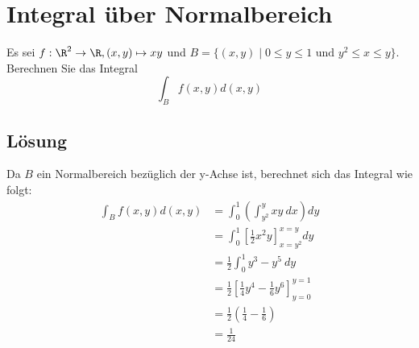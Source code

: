 \newpage
\section{Integral über Normalbereich}
Es sei $f: \R^2 \to \R, (x,y) \mapsto xy$ und $B=\{(x,y) \mid 0\le y\le 1 \text{ und } y^2 \le x \le y\}$. Berechnen Sie das Integral
$$
\int_B f(x,y)d(x,y)
$$
 
\subsection*{Lösung}
Da $B$ ein Normalbereich bezüglich der y-Achse ist, berechnet sich das Integral wie folgt:
\begin{align*}
\int_B f(x,y)d(x,y)&=\int_0^1 \left( \int_{y^2}^y xy \ dx \right) dy\\
&= \int_0^1 \left[ \frac{1}{2}x^2y\right]_{x=y^2}^{x=y} dy\\
&=\frac{1}{2}\int_0^1  y^3-y^5 \ dy \\
&=\frac{1}{2} \left[ \frac{1}{4}y^4 - \frac{1}{6} y^6 \right]_{y=0}^{y=1}\\
&=\frac{1}{2}( \frac{1}{4} - \frac{1}{6})\\
&=\frac{1}{24}
\end{align*}


